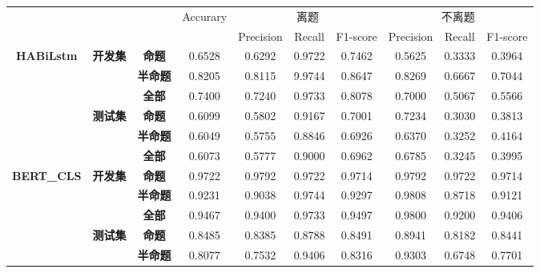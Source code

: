 \documentclass[11pt]{article}
\begin{document}
\begin{CJK}{UTF8}{gkai}
\begin{table}[htbp]\small
  \centering
    \begin{tabular}{cccccccccc}
      \hline
      \multicolumn{3}{c}{\multirow{2}[0]{*}{\textcolor[rgb]{ 1,  0,  0}{}}} & \multicolumn{1}{c}{\multirow{2}[0]{*}{Accurary}} & \multicolumn{3}{p{12.57em}}{离题} & \multicolumn{3}{p{12.57em}}{不离题} \\
      \multicolumn{3}{c}{}  &       & \multicolumn{1}{p{4.19em}}{Precision} & \multicolumn{1}{p{4.19em}}{Recall} & \multicolumn{1}{p{4.19em}}{F1-score} & \multicolumn{1}{p{4.19em}}{Precision} & \multicolumn{1}{p{4.19em}}{Recall} & \multicolumn{1}{p{4.19em}}{F1-score} \\
      \hline
      \multicolumn{1}{c}{\multirow{6}[0]{*}{\textbf{HABiLstm}}} & \multicolumn{1}{c}{\multirow{3}[0]{*}{\textbf{开发集}}} & \textbf{命题} & 0.6528  & 0.6292  & 0.9722  & 0.7462  & 0.5625  & 0.3333  & 0.3964  \\
      &       & \textbf{半命题} & 0.8205  & 0.8115  & 9.9744  & 0.8647  & 0.8269  & 0.6667  & 0.7044  \\
      &       & \textbf{全部} & 0.7400  & 0.7240  & 0.9733  & 0.8078  & 0.7000  & 0.5067  & 0.5566  \\
      \cline{2-10}
      & \multicolumn{1}{c}{\multirow{3}[0]{*}{\textbf{测试集}}} & \textbf{命题} & 0.6099  & 0.5802  & 0.9167  & 0.7001  & 0.7234  & 0.3030  & 0.3813  \\
      &       & \textbf{半命题} & 0.6049  & 0.5755  & 0.8846  & 0.6926  & 0.6370  & 0.3252  & 0.4164  \\
      &       & \textbf{全部} & 0.6073  & 0.5777  & 0.9000  & 0.6962  & 0.6785  & 0.3245  & 0.3995  \\
      \hline
      \multicolumn{1}{c}{\multirow{6}[0]{*}{\textbf{BERT\_CLS}}} & \multicolumn{1}{c}{\multirow{3}[0]{*}{\textbf{开发集}}} & \textbf{命题} & 0.9722  & 0.9792  & 0.9722  & 0.9714  & 0.9792  & 0.9722  & 0.9714  \\
      &       & \textbf{半命题} & 0.9231  & 0.9038  & 0.9744  & 0.9297  & 0.9808  & 0.8718  & 0.9121  \\
      &       & \textbf{全部} & 0.9467  & 0.9400  & 0.9733  & 0.9497  & 0.9800  & 0.9200  & 0.9406  \\
      \cline{2-10}
      & \multicolumn{1}{c}{\multirow{3}[0]{*}{\textbf{测试集}}} & \textbf{命题} & 0.8485  & 0.8385  & 0.8788  & 0.8491  & 0.8941  & 0.8182  & 0.8441  \\
      &       & \textbf{半命题} & 0.8077  & 0.7532  & 0.9406  & 0.8316  & 0.9303  & 0.6748  & 0.7701  \\

\end{tabular}
\end{table}
\end{CJK}
\end{document}
